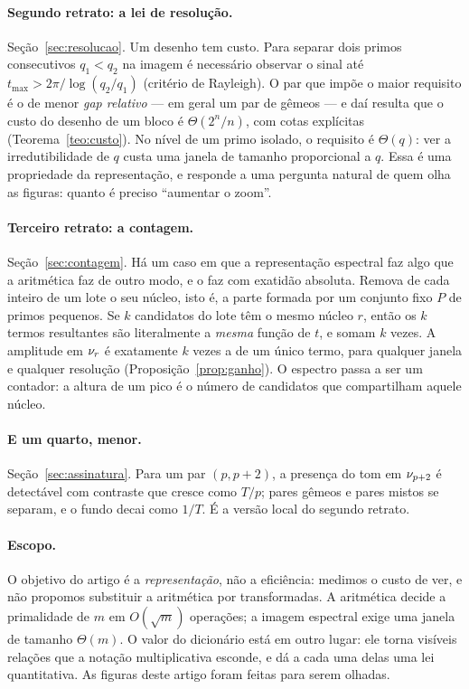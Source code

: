 \paragraph{Segundo retrato: a lei de resolução.} Seção~\ref{sec:resolucao}. Um
desenho tem custo. Para separar dois primos consecutivos $q_1<q_2$ na imagem é
necessário observar o sinal até $t_{\max} > 2\pi/\log(q_2/q_1)$ (critério de
Rayleigh). O par que impõe o maior requisito é o de menor \emph{gap relativo} —
em geral um par de gêmeos — e daí resulta que o custo do desenho de um bloco é
$\Theta(2^n/n)$, com cotas explícitas (Teorema~\ref{teo:custo}). No nível de um
primo isolado, o requisito é $\Theta(q)$: ver a irredutibilidade de $q$ custa uma
janela de tamanho proporcional a $q$. Essa é uma propriedade da representação, e
responde a uma pergunta natural de quem olha as figuras: quanto é preciso
``aumentar o zoom''.

\paragraph{Terceiro retrato: a contagem.} Seção~\ref{sec:contagem}. Há um caso em
que a representação espectral faz algo que a aritmética faz de outro modo, e o faz
com exatidão absoluta. Remova de cada inteiro de um lote o seu núcleo, isto é, a
parte formada por um conjunto fixo $P$ de primos pequenos. Se $k$ candidatos do
lote têm o mesmo núcleo $r$, então os $k$ termos resultantes são literalmente a
\emph{mesma} função de $t$, e somam $k$ vezes. A amplitude em $\nu_{r}$ é
exatamente $k$ vezes a de um único termo, para qualquer janela e qualquer
resolução (Proposição~\ref{prop:ganho}). O espectro passa a ser um contador:
a altura de um pico é o número de candidatos que compartilham aquele núcleo.

\paragraph{E um quarto, menor.} Seção~\ref{sec:assinatura}. Para um par
$(p,p+2)$, a presença do tom em $\nu_{p+2}$ é detectável com contraste que cresce
como $T/p$; pares gêmeos e pares mistos se separam, e o fundo decai como
$1/T$. É a versão local do segundo retrato.

\medskip

\paragraph{Escopo.} O objetivo do artigo é a \emph{representação}, não a
eficiência: medimos o custo de ver, e não propomos substituir a aritmética por
transformadas. A aritmética decide a primalidade de $m$ em $O(\sqrt m)$ operações;
a imagem espectral exige uma janela de tamanho $\Theta(m)$. O valor do dicionário
está em outro lugar: ele torna visíveis relações que a notação multiplicativa
esconde, e dá a cada uma delas uma lei quantitativa. As figuras deste artigo foram
feitas para serem olhadas.

